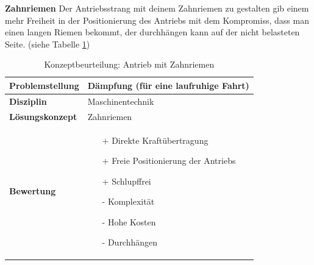 \documentclass[../../../main.tex]{subfiles}
\begin{document}
\textbf{Zahnriemen}
Der Antriebsstrang mit deinem Zahnriemen zu gestalten gib einem mehr Freiheit in der Positionierung des Antriebs mit dem Kompromiss, dass man einen langen Riemen bekommt, der durchhängen kann auf der nicht belasteten Seite. (siehe Tabelle \ref{tab:konzept_fahrwerk_zahnriemen})

\begin{flushleft}
    \begin{table}[h]
    \begin{tabular}{ | l | p{11cm} |}
    \hline
    \textbf{Problemstellung} & Dämpfung (für eine laufruhige Fahrt) \\ \hline
    \textbf{Disziplin} & Maschinentechnik \\ \hline
    \textbf{Lösungskonzept} & Zahnriemen \\ \hline
    \textbf{Bewertung} &  \begin{itemize}
                            \item[+] Direkte Kraftübertragung
                            \item[+] Freie Positionierung der Antriebs
                            \item[+] Schlupffrei
                            \item[-] Komplexität
                            \item[-] Hohe Kosten
                            \item[-] Durchhängen
                          \end{itemize} \\ \hline
    \end{tabular}
    \caption{Konzeptbeurteilung: Antrieb mit Zahnriemen}
    \label{tab:konzept_fahrwerk_zahnriemen}
\end{table}
\end{flushleft}
\end{document}
